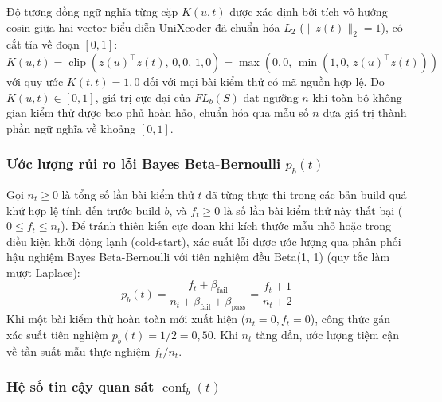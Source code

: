 Độ tương đồng ngữ nghĩa từng cặp $K(u, t)$ được xác định bởi tích vô hướng cosin giữa hai vector biểu diễn UniXcoder đã chuẩn hóa $L_2$ ($\|z(t)\|_2 = 1$), có cắt tỉa về đoạn $[0, 1]$:
\begin{equation}
\label{eq:kernel_similarity}
K(u, t) = \operatorname{clip}\left(z(u)^\top z(t), \, 0{,}0, \, 1{,}0\right) = \max\left(0{,}0, \, \min\left(1{,}0, \, z(u)^\top z(t)\right)\right)
\end{equation}
với quy ước $K(t, t) = 1{,}0$ đối với mọi bài kiểm thử có mã nguồn hợp lệ. Do $K(u, t) \in [0, 1]$, giá trị cực đại của $FL_b(S)$ đạt ngưỡng $n$ khi toàn bộ không gian kiểm thử được bao phủ hoàn hảo, chuẩn hóa qua mẫu số $n$ đưa giá trị thành phần ngữ nghĩa về khoảng $[0, 1]$.

\subsubsection{Ước lượng rủi ro lỗi Bayes Beta-Bernoulli \texorpdfstring{$p_b(t)$}{pb(t)}}
\label{subsubsec:beta_bernoulli}

Gọi $n_t \ge 0$ là tổng số lần bài kiểm thử $t$ đã từng thực thi trong các bản build quá khứ hợp lệ tính đến trước build $b$, và $f_t \ge 0$ là số lần bài kiểm thử này thất bại ($0 \le f_t \le n_t$). Để tránh thiên kiến cực đoan khi kích thước mẫu nhỏ hoặc trong điều kiện khởi động lạnh (cold-start), xác suất lỗi được ước lượng qua phân phối hậu nghiệm Bayes Beta-Bernoulli với tiên nghiệm đều Beta(1, 1) (quy tắc làm mượt Laplace):
\begin{equation}
\label{eq:bayes_prob}
p_b(t) = \frac{f_t + \beta_{\text{fail}}}{n_t + \beta_{\text{fail}} + \beta_{\text{pass}}} = \frac{f_t + 1}{n_t + 2}
\end{equation}
Khi một bài kiểm thử hoàn toàn mới xuất hiện ($n_t = 0, f_t = 0$), công thức gán xác suất tiên nghiệm $p_b(t) = 1/2 = 0{,}50$. Khi $n_t$ tăng dần, ước lượng tiệm cận về tần suất mẫu thực nghiệm $f_t / n_t$.

\subsubsection{Hệ số tin cậy quan sát \texorpdfstring{$\operatorname{conf}_b(t)$}{conf\_b(t)}}
\label{subsubsec:confidence_factor}

